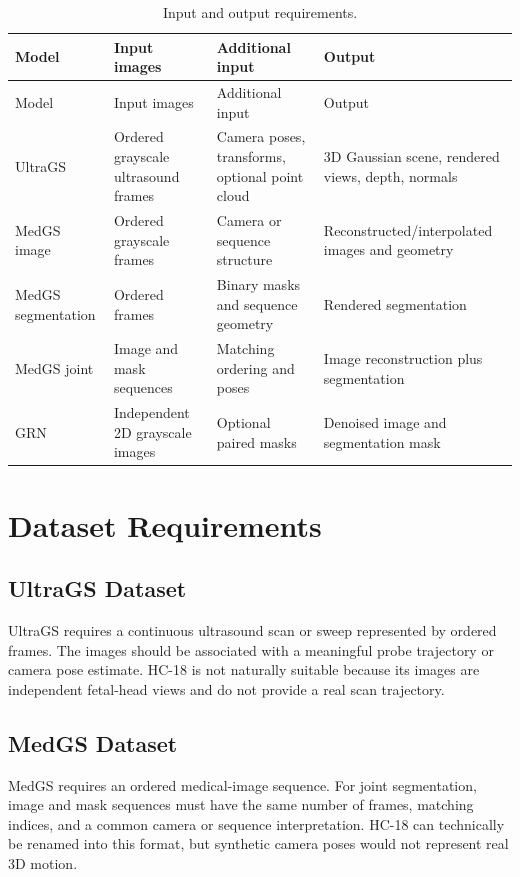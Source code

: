 \documentclass[11pt,a4paper]{article}
\begin{document}
\begin{longtable}{p{} p{} p{} p{}}
\caption{Input and output requirements.}\label{tab:io}\\
\toprule
Model & Input images & Additional input & Output \\
\midrule
\endfirsthead
\toprule
Model & Input images & Additional input & Output \\
\midrule
\endhead
UltraGS & Ordered grayscale ultrasound frames & Camera poses, transforms, optional point cloud & 3D Gaussian scene, rendered views, depth, normals \\
MedGS image & Ordered grayscale frames & Camera or sequence structure & Reconstructed/interpolated images and geometry \\
MedGS segmentation & Ordered frames & Binary masks and sequence geometry & Rendered segmentation \\
MedGS joint & Image and mask sequences & Matching ordering and poses & Image reconstruction plus segmentation \\
GRN & Independent 2D grayscale images & Optional paired masks & Denoised image and segmentation mask \\
\bottomrule
\end{longtable}

\section{Dataset Requirements}

\subsection{UltraGS Dataset}
UltraGS requires a continuous ultrasound scan or sweep represented by ordered frames. The images should be associated with a meaningful probe trajectory or camera pose estimate. HC-18 is not naturally suitable because its images are independent fetal-head views and do not provide a real scan trajectory.

\subsection{MedGS Dataset}
MedGS requires an ordered medical-image sequence. For joint segmentation, image and mask sequences must have the same number of frames, matching indices, and a common camera or sequence interpretation. HC-18 can technically be renamed into this format, but synthetic camera poses would not represent real 3D motion.
\end{document}
